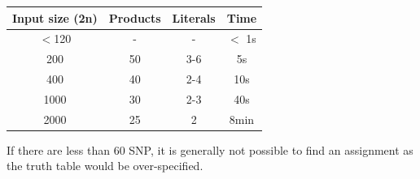 \documentclass[letterpaper, 11pt]{article}
\begin{document}
\begin{center}
\begin{tabular}{ c| c| c| c}
 \textbf{Input size (2n)} & \textbf{Products} & \textbf{Literals} & \textbf{Time} \\ \hline
 $<$120& -&-&$<$ 1s\\
 200 & 50 & 3-6&5s\\  
 400 & 40 & 2-4  & 10s \\
 1000& 30&2-3&40s\\
 2000&25&2&8min
\end{tabular}
\end{center}
\begin{figure}[!h]
\end{figure}
\begin{figure}[!h] \end{figure}
If there are less than 60 SNP, it is generally not possible to find an assignment as the truth table would be over-specified. \\
\end{document}
